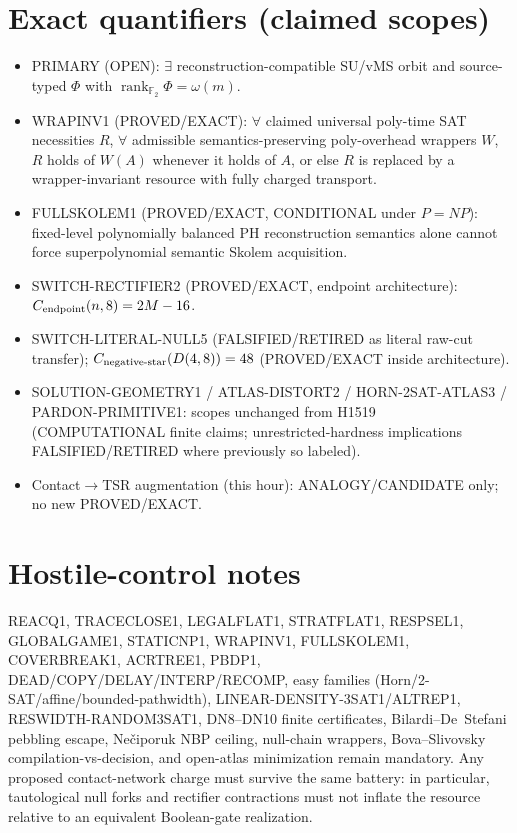 \documentclass[11pt]{article}
\begin{document}
\section*{Exact quantifiers (claimed scopes)}
\begin{itemize}
\item PRIMARY (OPEN): $\exists$ reconstruction-compatible SU/vMS orbit and source-typed
  $\Phi$ with $\operatorname{rank}_{\mathbb F_2}\Phi=\omega(m)$.
\item WRAPINV1 (PROVED/EXACT): $\forall$ claimed universal poly-time SAT necessities $R$,
  $\forall$ admissible semantics-preserving poly-overhead wrappers $W$, $R$ holds of $W(A)$
  whenever it holds of $A$, or else $R$ is replaced by a wrapper-invariant resource with
  fully charged transport.
\item FULLSKOLEM1 (PROVED/EXACT, CONDITIONAL under $P=NP$): fixed-level polynomially
  balanced PH reconstruction semantics alone cannot force superpolynomial semantic Skolem
  acquisition.
\item SWITCH-RECTIFIER2 (PROVED/EXACT, endpoint architecture):
  $C_{\rm endpoint}(n,8)=2M-16$.
\item SWITCH-LITERAL-NULL5 (FALSIFIED/RETIRED as literal raw-cut transfer);
  $C_{\rm negative\textrm{-}star}(D(4,8))=48$ (PROVED/EXACT inside architecture).
\item SOLUTION-GEOMETRY1 / ATLAS-DISTORT2 / HORN-2SAT-ATLAS3 / PARDON-PRIMITIVE1:
  scopes unchanged from H1519 (COMPUTATIONAL finite claims; unrestricted-hardness
  implications FALSIFIED/RETIRED where previously so labeled).
\item Contact$\to$TSR augmentation (this hour): ANALOGY/CANDIDATE only; no new PROVED/EXACT.
\end{itemize}

\section*{Hostile-control notes}
REACQ1, TRACECLOSE1, LEGALFLAT1, STRATFLAT1, RESPSEL1, GLOBALGAME1, STATICNP1, WRAPINV1,
FULLSKOLEM1, COVERBREAK1, ACRTREE1, PBDP1, DEAD/COPY/DELAY/INTERP/RECOMP, easy families
(Horn/2-SAT/affine/bounded-pathwidth), LINEAR-DENSITY-3SAT1/ALTREP1, RESWIDTH-RANDOM3SAT1,
DN8--DN10 finite certificates, Bilardi--De~Stefani pebbling escape, Ne\v{c}iporuk NBP ceiling,
null-chain wrappers, Bova--Slivovsky compilation-vs-decision, and open-atlas minimization
remain mandatory. Any proposed contact-network charge must survive the same battery:
in particular, tautological null forks and rectifier contractions must not inflate the
resource relative to an equivalent Boolean-gate realization.
\end{document}
